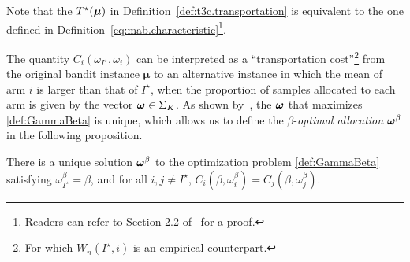 Note that the $T^\star({\boldsymbol \mu})$ in Definition~\ref{def:t3c.transportation} is equivalent to the one defined in Definition~\ref{eq:mab.characteristic}\footnote{Readers can refer to Section 2.2 of~\cite{garivier2016tracknstop} for a proof.}.

The quantity $C_i(\omega_{I^\star},\omega_i)$ can be interpreted as a ``transportation cost''\footnote{For which $W_n(I^\star,i)$ is an empirical counterpart.} from the original bandit instance $\bm\mu$ to an alternative instance in which the mean of arm $i$ is larger than that of $I^\star$, when the proportion of samples allocated to each arm is given by the vector ${\boldsymbol \omega} \in \Sigma_K$. As shown by~\cite{russo2016ttts}, the ${\boldsymbol \omega}$ that maximizes \eqref{def:GammaBeta} is unique, which allows us to define the $\beta$-\emph{optimal allocation} ${\boldsymbol \omega}^\beta$ in the following proposition.

\begin{proposition}\label{prop:optim}
\begin{leftbar}[propositionbar]
There is a unique solution ${\boldsymbol \omega}^\beta$ to the optimization problem \eqref{def:GammaBeta}
satisfying $\omega_{I^\star}^\beta = \beta$, and for all $i,j \neq I^\star$, $C_i(\beta,\omega_i^\beta) = C_j(\beta,\omega_j^\beta)$.
\end{leftbar}
\end{proposition}

